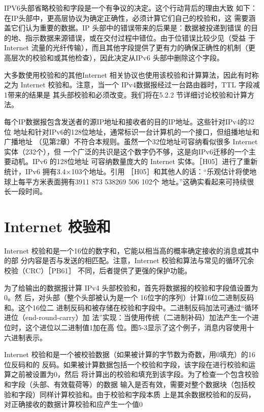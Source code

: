 \begin{tcolorbox}
    IPV6头部省略校验和字段是一个有争议的决定。这个行动背后的理由大致
    如下：在IP头部中，更高层协议为确定正确性，必须计算它们自己的校验和，这
    需要涵盖它们认为重要的数据。IP 头部中的错误带来的后果是：数据被投递到错误
    的目的地、指示数据来源错误，或在交付过程中错位。由于位错误比较少见（受益
    于 Internet 流量的光纤传输），而且其他字段提供了更有力的确保正确性的机制（更
    高层次的校验和或其他检查），因此决定从IPv6 头部中删除这个字段。
\end{tcolorbox}

大多数使用校验和的其他Internet 相关协议也使用该校验和计算算法，因此有时称之为
Internet 校验和。注意，当一个 IPv4数据报经过一台路由器时，TTL 字段减1带来的结果是
其头部校验和必须改变。我们将在5.2.2 节详细讨论校验和计算方法。

每个IP数据报包含发送者的源IP地址和接收者的目的IP地址。这些针对IPv4的32位
地址和针对IPv6的128位地址，通常标识一台计算机的一个接口，但组播地址和广播地址
（见第2章）不符合本规则。虽然一个32位地址可容纳看似很多 Internet 实体（232个），但
一个广泛的共识是这个数字仍不够，这是向IPv6迁移的一个主要动机。IPv6 的128位地址
可容纳数量庞大的 Internet 实体。［H05］进行了重新统计，IPv6 拥有3.4×103个地址。引用
［H05］和其他人的话：“乐观估计将使地球上每平方米表面拥有3911 873 538269 506 102个
地址。”这确实看起来可持续很长一段时间。

\section{Internet 校验和}

Internet 校验和是一个16位的数字和，它能以相当高的概率确定接收的消息或其中的部
分内容是否与发送的相匹配。注意，Internet 校验和算法与常见的循环冗余校验（CRC）［PB61］
不同，后者提供了更强的保护功能。

为了给输出的数据报计算 IPv4 头部校验和，首先将数据报的校验和字段值设置为0。然
后，对头部（整个头部被认为是一个 16位字的序列）计算16位二进制反码和。这个16位二
进制反码和被存储在校验和字段中。二进制反码加法可通过“循环进位（end-round-carry）加
法”实现：当使用传统（二进制补码）加法产生一个进位时，这个进位以二进制值1加在高
位。图5-3显示了这个例子，消息内容使用十六进制表示。

Internet 校验和是一个被校验数据（如果被计算的字节数为奇数，用0填充）的16位反码和的
反码。如果被计算数据包括一个校验和字段，该字段在进行校验和运算之前被设置为0，然后
将计算出的校验和填充到该字段。为了检查一个包含校验和字段（头部、有效载荷等）的数据
输入是否有效，需要对整个数据块（包括校验和字段）同样计算校验和。由于校验和字段本质
上是其余数据校验和的反码，对正确接收的数据计算校验和应产生一个值0

